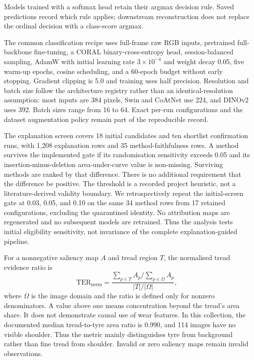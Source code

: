 Models trained with a softmax head retain their argmax decision rule. Saved predictions record which rule applies; downstream reconstruction does not replace the ordinal decision with a class-score argmax.

The common classification recipe uses full-frame raw RGB inputs, pretrained full-backbone fine-tuning, a CORAL binary-cross-entropy head, session-balanced sampling, AdamW with initial learning rate $3\times10^{-4}$ and weight decay 0.05, five warm-up epochs, cosine scheduling, and a 60-epoch budget without early stopping. Gradient clipping is 5.0 and training uses half precision. Resolution and batch size follow the architecture registry rather than an identical-resolution assumption: most inputs are 384 pixels, Swin and CoAtNet use 224, and DINOv2 uses 392. Batch sizes range from 16 to 64. Exact per-run configurations and the dataset augmentation policy remain part of the reproducible record.

The explanation screen covers 18 initial candidates and ten shortlist confirmation runs, with 1,208 explanation rows and 35 method-faithfulness rows. A method survives the implemented gate if its randomisation sensitivity exceeds 0.05 and its insertion-minus-deletion area-under-curve value is non-missing. Surviving methods are ranked by that difference. There is no additional requirement that the difference be positive. The threshold is a recorded project heuristic, not a literature-derived validity boundary. We retrospectively repeat the initial-screen gate at 0.03, 0.05, and 0.10 on the same 34 method rows from 17 retained configurations, excluding the quarantined identity. No attribution maps are regenerated and no subsequent models are retrained. Thus the analysis tests initial eligibility sensitivity, not invariance of the complete explanation-guided pipeline.

For a nonnegative saliency map $A$ and tread region $T$, the normalised tread evidence ratio is
\begin{equation}
\mathrm{TER}_{\mathrm{norm}}=
\frac{\sum_{p\in T}A_p/\sum_{p\in\Omega}A_p}{|T|/|\Omega|},
\label{eq:ter}
\end{equation}
where $\Omega$ is the image domain and the ratio is defined only for nonzero denominators. A value above one means concentration beyond the tread's area share. It does not demonstrate causal use of wear features. In this collection, the documented median tread-to-tyre area ratio is 0.990, and 114 images have no visible shoulder. Thus the metric mainly distinguishes tyre from background rather than fine tread from shoulder. Invalid or zero saliency maps remain invalid observations.

